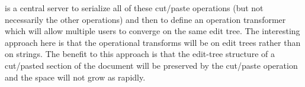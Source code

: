 \documentclass{amsart}
\begin{document}
%
%
%
%
%
%
%
%
%
%
%
%



is a central server to serialize all of these cut/paste operations (but
not necessarily the other operations) and then to define an operation
transformer which will allow multiple users to converge on the same
edit tree.  The interesting approach here is that the operational transforms
will be on edit trees rather than on strings.  The benefit to this approach
is that the edit-tree structure of a cut/pasted section of the document
will be preserved by the cut/paste operation and the space will not grow
as rapidly. 




\end{document}
